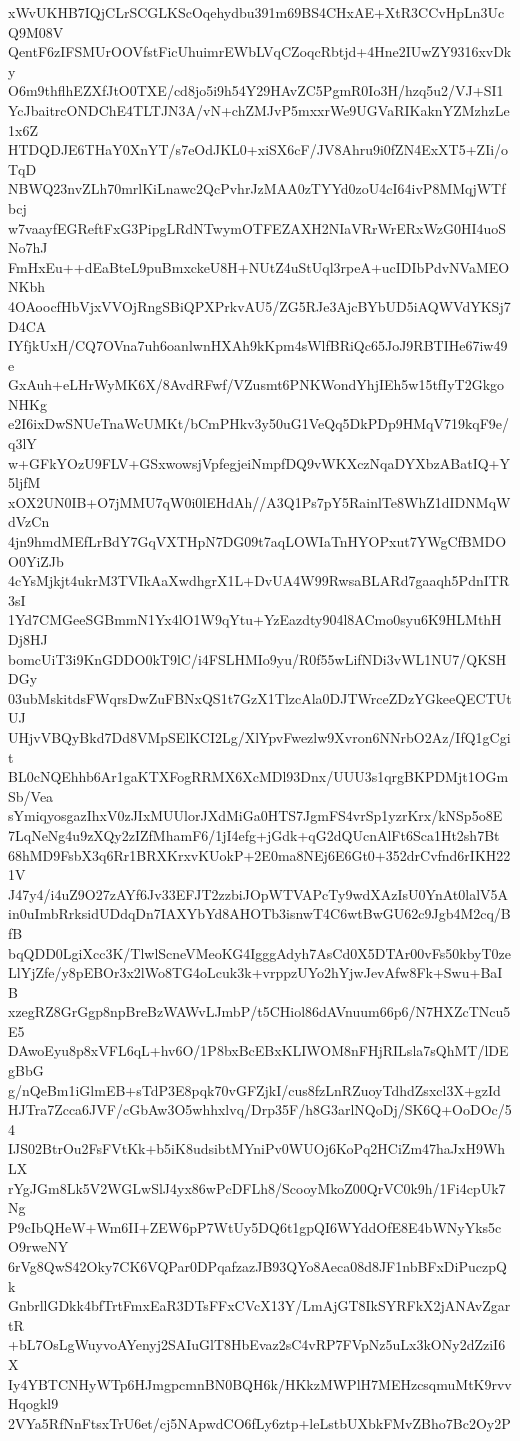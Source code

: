 xWvUKHB7IQjCLrSCGLKScOqehydbu391m69BS4CHxAE+XtR3CCvHpLn3UcQ9M08V
QentF6zIFSMUrOOVfstFicUhuimrEWbLVqCZoqcRbtjd+4Hne2IUwZY9316xvDky
O6m9thflhEZXfJtO0TXE/cd8jo5i9h54Y29HAvZC5PgmR0Io3H/hzq5u2/VJ+SI1
YcJbaitrcONDChE4TLTJN3A/vN+chZMJvP5mxxrWe9UGVaRIKaknYZMzhzLe1x6Z
HTDQDJE6THaY0XnYT/s7eOdJKL0+xiSX6cF/JV8Ahru9i0fZN4ExXT5+ZIi/oTqD
NBWQ23nvZLh70mrlKiLnawc2QcPvhrJzMAA0zTYYd0zoU4cI64ivP8MMqjWTfbcj
w7vaayfEGReftFxG3PipgLRdNTwymOTFEZAXH2NIaVRrWrERxWzG0HI4uoSNo7hJ
FmHxEu++dEaBteL9puBmxckeU8H+NUtZ4uStUql3rpeA+ucIDIbPdvNVaMEONKbh
4OAoocfHbVjxVVOjRngSBiQPXPrkvAU5/ZG5RJe3AjcBYbUD5iAQWVdYKSj7D4CA
IYfjkUxH/CQ7OVna7uh6oanlwnHXAh9kKpm4sWlfBRiQc65JoJ9RBTIHe67iw49e
GxAuh+eLHrWyMK6X/8AvdRFwf/VZusmt6PNKWondYhjIEh5w15tfIyT2GkgoNHKg
e2I6ixDwSNUeTnaWcUMKt/bCmPHkv3y50uG1VeQq5DkPDp9HMqV719kqF9e/q3lY
w+GFkYOzU9FLV+GSxwowsjVpfegjeiNmpfDQ9vWKXczNqaDYXbzABatIQ+Y5ljfM
xOX2UN0IB+O7jMMU7qW0i0lEHdAh//A3Q1Ps7pY5RainlTe8WhZ1dIDNMqWdVzCn
4jn9hmdMEfLrBdY7GqVXTHpN7DG09t7aqLOWIaTnHYOPxut7YWgCfBMDOO0YiZJb
4cYsMjkjt4ukrM3TVIkAaXwdhgrX1L+DvUA4W99RwsaBLARd7gaaqh5PdnITR3sI
1Yd7CMGeeSGBmmN1Yx4lO1W9qYtu+YzEazdty904l8ACmo0syu6K9HLMthHDj8HJ
bomcUiT3i9KnGDDO0kT9lC/i4FSLHMIo9yu/R0f55wLifNDi3vWL1NU7/QKSHDGy
03ubMskitdsFWqrsDwZuFBNxQS1t7GzX1TlzcAla0DJTWrceZDzYGkeeQECTUtUJ
UHjvVBQyBkd7Dd8VMpSElKCI2Lg/XlYpvFwezlw9Xvron6NNrbO2Az/IfQ1gCgit
BL0cNQEhhb6Ar1gaKTXFogRRMX6XcMDl93Dnx/UUU3s1qrgBKPDMjt1OGmSb/Vea
sYmiqyosgazIhxV0zJIxMUUlorJXdMiGa0HTS7JgmFS4vrSp1yzrKrx/kNSp5o8E
7LqNeNg4u9zXQy2zIZfMhamF6/1jI4efg+jGdk+qG2dQUcnAlFt6Sca1Ht2sh7Bt
68hMD9FsbX3q6Rr1BRXKrxvKUokP+2E0ma8NEj6E6Gt0+352drCvfnd6rIKH221V
J47y4/i4uZ9O27zAYf6Jv33EFJT2zzbiJOpWTVAPcTy9wdXAzIsU0YnAt0lalV5A
in0uImbRrksidUDdqDn7IAXYbYd8AHOTb3isnwT4C6wtBwGU62c9Jgb4M2cq/BfB
bqQDD0LgiXcc3K/TlwlScneVMeoKG4IgggAdyh7AsCd0X5DTAr00vFs50kbyT0ze
LlYjZfe/y8pEBOr3x2lWo8TG4oLcuk3k+vrppzUYo2hYjwJevAfw8Fk+Swu+BaIB
xzegRZ8GrGgp8npBreBzWAWvLJmbP/t5CHiol86dAVnuum66p6/N7HXZcTNcu5E5
DAwoEyu8p8xVFL6qL+hv6O/1P8bxBcEBxKLIWOM8nFHjRILsla7sQhMT/lDEgBbG
g/nQeBm1iGlmEB+sTdP3E8pqk70vGFZjkI/cus8fzLnRZuoyTdhdZsxcl3X+gzId
HJTra7Zcca6JVF/cGbAw3O5whhxlvq/Drp35F/h8G3arlNQoDj/SK6Q+OoDOc/54
IJS02BtrOu2FsFVtKk+b5iK8udsibtMYniPv0WUOj6KoPq2HCiZm47haJxH9WhLX
rYgJGm8Lk5V2WGLwSlJ4yx86wPcDFLh8/ScooyMkoZ00QrVC0k9h/1Fi4cpUk7Ng
P9cIbQHeW+Wm6II+ZEW6pP7WtUy5DQ6t1gpQI6WYddOfE8E4bWNyYks5cO9rweNY
6rVg8QwS42Oky7CK6VQPar0DPqafzazJB93QYo8Aeca08d8JF1nbBFxDiPuczpQk
GnbrllGDkk4bfTrtFmxEaR3DTsFFxCVcX13Y/LmAjGT8IkSYRFkX2jANAvZgartR
+bL7OsLgWuyvoAYenyj2SAIuGlT8HbEvaz2sC4vRP7FVpNz5uLx3kONy2dZziI6X
Iy4YBTCNHyWTp6HJmgpcmnBN0BQH6k/HKkzMWPlH7MEHzcsqmuMtK9rvvHqogkl9
2VYa5RfNnFtsxTrU6et/cj5NApwdCO6fLy6ztp+leLstbUXbkFMvZBho7Bc2Oy2P
